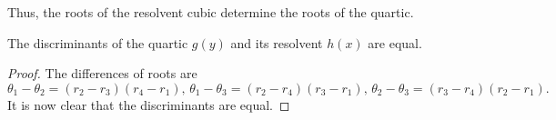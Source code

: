 Thus, the roots of the resolvent cubic determine the roots of the quartic. 

\begin{prop}
	The discriminants of the quartic $g(y)$ and its resolvent $h(x)$ are equal.
\end{prop}
\begin{proof} 
	The differences of roots are 
	\begin{equation*} 
		\theta_1 - \theta_2 = (r_2 - r_3)(r_4 - r_1),\, \theta_1 - \theta_3 = (r_2 - r_4)(r_3 - r_1),\, \theta_2 - \theta_3 = (r_3 - r_4)(r_2 - r_1).
	\end{equation*}	
	It is now clear that the discriminants are equal.
\end{proof}